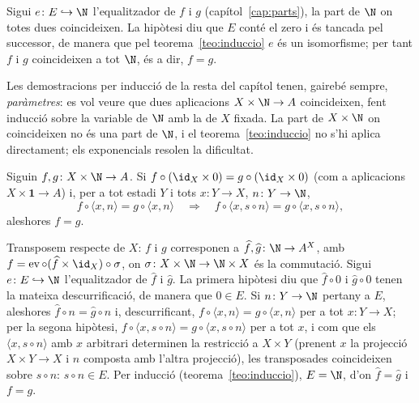 \begin{prova}
Sigui \(e\colon E\hookrightarrow\N\) l'equalitzador de \(f\) i \(g\)
(capítol~\ref{cap:parts}), la part de \(\N\) on totes dues coincideixen.
La hipòtesi diu que \(E\) conté el zero i és tancada pel successor, de
manera que pel teorema~\ref{teo:induccio} \(e\) és un isomorfisme; per
tant \(f\) i \(g\) coincideixen a tot \(\N\), és a dir, \(f=g\).
\end{prova}

Les demostracions per inducció de la resta del capítol tenen, gairebé
sempre, \emph{paràmetres}: es vol veure que dues aplicacions
\(X\times\N\to A\) coincideixen, fent inducció sobre la variable de \(\N\)
amb la de \(X\) fixada. La part de \(X\times\N\) on coincideixen no és
una part de \(\N\), i el teorema~\ref{teo:induccio} no s'hi aplica
directament; els exponencials resolen la dificultat.

\begin{corollari}\label{cor:induccio-parametres}
Siguin \(f,g\colon X\times\N\to A\). Si
\(f\circ(\id_X\times0)=g\circ(\id_X\times0)\) (com a aplicacions
\(X\times\mathbf1\to A\)) i, per a tot estadi \(Y\) i tots
\(x\colon Y\to X\), \(n\colon Y\to\N\),
\[
f\circ\langle x,n\rangle=g\circ\langle x,n\rangle
\quad\Longrightarrow\quad
f\circ\langle x,s\circ n\rangle=g\circ\langle x,s\circ n\rangle,
\]
aleshores \(f=g\).
\end{corollari}

\begin{prova}
Transposem respecte de \(X\): \(f\) i \(g\) corresponen a
\(\widehat f,\widehat g\colon\N\to A^{X}\), amb
\(f=\operatorname{ev}\circ(\widehat f\times\id_X)\circ\sigma\), on
\(\sigma\colon X\times\N\to\N\times X\) és la commutació. Sigui
\(e\colon E\hookrightarrow\N\) l'equalitzador de \(\widehat f\) i
\(\widehat g\). La primera hipòtesi diu que
\(\widehat f\circ0\) i \(\widehat g\circ0\) tenen la mateixa
descurrificació, de manera que \(0\in E\). Si \(n\colon Y\to\N\) pertany a
\(E\), aleshores \(\widehat f\circ n=\widehat g\circ n\) i, descurrificant,
\(f\circ\langle x,n\rangle=g\circ\langle x,n\rangle\) per a tot
\(x\colon Y\to X\); per la segona hipòtesi,
\(f\circ\langle x,s\circ n\rangle=g\circ\langle x,s\circ n\rangle\) per a
tot \(x\), i com que els \(\langle x,s\circ n\rangle\) amb \(x\) arbitrari
determinen la restricció a \(X\times Y\) (prenent \(x\) la projecció
\(X\times Y\to X\) i \(n\) composta amb l'altra projecció), les
transposades coincideixen sobre \(s\circ n\): \(s\circ n\in E\). Per
inducció (teorema~\ref{teo:induccio}), \(E=\N\), d'on
\(\widehat f=\widehat g\) i \(f=g\).
\end{prova}

